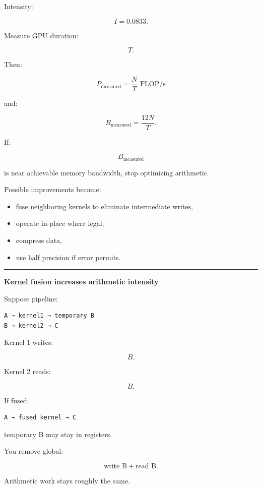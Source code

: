 Intensity:

\[
I=0.0833.
\]

Measure GPU duration:

\[
T.
\]

Then:

\[
P_{\text{measured}}
=
\frac{
N
}{
T
}
\text{ FLOP/s}
\]

and:

\[
B_{\text{measured}}
=
\frac{
12N
}{
T
}
.
\]

If:

\[
B_{\text{measured}}
\]

is near achievable memory bandwidth, stop optimizing arithmetic.

Possible improvements become:

\begin{itemize}
\tightlist
\item
  fuse neighboring kernels to eliminate intermediate writes,
\item
  operate in-place where legal,
\item
  compress data,
\item
  use half precision if error permits.
\end{itemize}

\begin{center}\rule{0.5\linewidth}{0.5pt}\end{center}

\textbf{Kernel fusion increases arithmetic intensity}

Suppose pipeline:

\protect{}\label{p10-fusion-before}%
\begin{verbatim}
A → kernel1 → temporary B
B → kernel2 → C
\end{verbatim}

Kernel 1 writes:

\[
B.
\]

Kernel 2 reads:

\[
B.
\]

If fused:

\protect{}\label{p10-fusion-after}%
\begin{verbatim}
A → fused kernel → C
\end{verbatim}

temporary B may stay in registers.

You remove global:

\[
\text{write B}+\text{read B}.
\]

Arithmetic work stays roughly the same.


